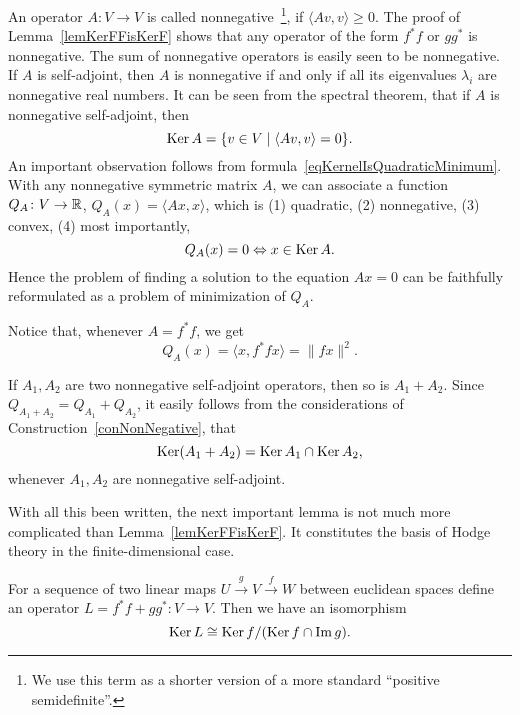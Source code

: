\begin{con}\label{conNonNegative}
An operator $A\colon V\to V$ is called nonnegative~\footnote{We use this term as a shorter version of a more standard ``positive semidefinite''.}, if $\langle Av,v\rangle\geq 0$. The proof of Lemma~\ref{lemKerFFisKerF} shows that any operator of the form $f^*f$ or $gg^*$ is nonnegative. The sum of nonnegative operators is easily seen to be nonnegative. If $A$ is self-adjoint, then $A$ is nonnegative if and only if all its eigenvalues $\lambda_i$ are nonnegative real numbers. It can be seen from the spectral theorem, that if $A$ is nonnegative self-adjoint, then
\begin{equation}\label{eqKernelIsQuadraticMinimum}
\operatorname{Ker} A=\{v\in V \mid \langle Av,v\rangle=0\}.
\end{equation}
An important observation follows from formula~\eqref{eqKernelIsQuadraticMinimum}. With any nonnegative symmetric matrix $A$, we can associate a function $Q_A\colon V\to\mathbb{R}$, $Q_A(x)=\langle Ax,x\rangle$, which is (1) quadratic, (2) nonnegative, (3) convex, (4) most importantly,
\begin{equation}\label{eqQuadraticMinimization}
Q_A(x)=0 \Leftrightarrow x\in\operatorname{Ker} A.
\end{equation}
Hence the problem of finding a solution to the equation $Ax=0$ can be faithfully reformulated as a problem of minimization of $Q_A$. 

Notice that, whenever $A=f^*f$, we get 
\begin{equation}\label{eqStupidObservation}
Q_A(x)=\langle x,f^*fx\rangle = \|fx\|^2.
\end{equation}
\end{con}



\begin{rem}\label{remKernelsIntersect}
If $A_1,A_2$ are two nonnegative self-adjoint operators, then so is $A_1+A_2$. Since $Q_{A_1+A_2}=Q_{A_1}+Q_{A_2}$, it easily follows from the considerations of Construction~\ref{conNonNegative}, that
\[
\operatorname{Ker}(A_1+A_2)=\operatorname{Ker} A_1\cap \operatorname{Ker} A_2,
\]
whenever $A_1,A_2$ are nonnegative self-adjoint.
\end{rem}

With all this been written, the next important lemma is not much more complicated than Lemma~\ref{lemKerFFisKerF}. It constitutes the basis of Hodge theory in the finite-dimensional case.

\begin{lem}\label{lemQuotientIsHarmonic}
For a sequence of two linear maps $U\stackrel{g}{\rightarrow} V\stackrel{f}{\rightarrow} W$ between euclidean spaces define an operator $L=f^*f+gg^*\colon V\to V$. Then we have an isomorphism
\[
\operatorname{Ker} L\cong \operatorname{Ker} f/(\operatorname{Ker} f\cap \operatorname{Im} g).
\]
\end{lem}

